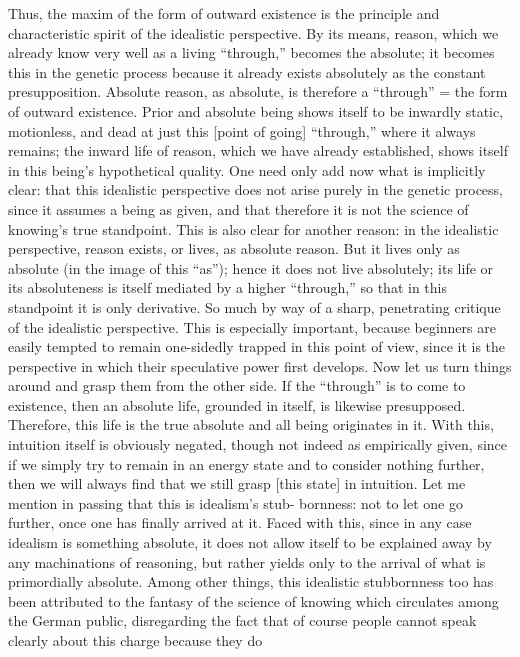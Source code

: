 Thus, the maxim of the form of outward existence is
the principle and characteristic spirit
of the idealistic perspective.
By its means, reason, which we already know very well
as a living “through,” becomes the absolute;
it becomes this in the genetic process
because it already exists absolutely
as the constant presupposition.
Absolute reason, as absolute, is therefore a “through” =
the form of outward existence.
Prior and absolute being shows itself to be
inwardly static, motionless, and dead at just this [point of going] “through,”
where it always remains;
the inward life of reason,
which we have already established,
shows itself in this being’s hypothetical quality.
One need only add now what is implicitly clear:
that this idealistic perspective does not arise
purely in the genetic process,
since it assumes a being as given,
and that therefore it is not
the science of knowing’s true standpoint.
This is also clear for another reason:
in the idealistic perspective, reason exists,
or lives, as absolute reason.
But it lives only as absolute
(in the image of this “as”);
hence it does not live absolutely;
its life or its absoluteness is itself mediated by
a higher “through,”
so that in this standpoint it is only derivative.
So much by  way of a sharp, penetrating
critique of the idealistic perspective.
 This is especially important, because beginners are easily tempted to remain one-sidedly
trapped in this point of view,
since it is the perspective in which their speculative power first develops.
Now let us turn things around and grasp them from the other side.
If the “through” is to come to existence,
then an absolute life, grounded in itself,
is likewise presupposed.
Therefore, this life is the true absolute
and all being originates in it.
With this, intuition itself is obviously negated, though not
indeed as empirically given, since if we simply try to remain in an energy state
and to consider nothing further, then we will always find that we still grasp
[this state] in intuition.
 Let me mention in passing that this is idealism’s stub-
bornness: not to let one go further, once one has finally arrived at it.
 Faced
with this, since in any case idealism is something absolute, it does not allow
itself to be explained away by any machinations of reasoning, but rather yields
only to the arrival of what is primordially absolute.
 Among other things, this
idealistic stubbornness too has been attributed to the fantasy of the science of
knowing which circulates among the German public, disregarding the fact
that of course people cannot speak clearly about this charge because they do
